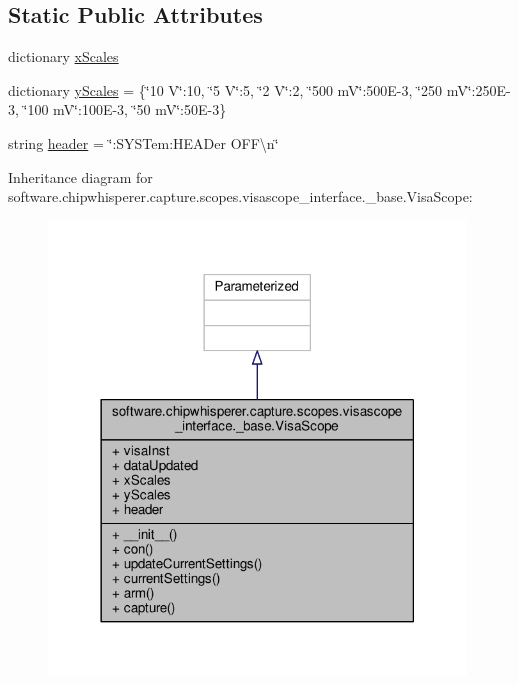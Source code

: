 \subsection*{Static Public Attributes}
\begin{DoxyCompactItemize}
\item 
dictionary \hyperlink{classsoftware_1_1chipwhisperer_1_1capture_1_1scopes_1_1visascope__interface_1_1__base_1_1VisaScope_ab74cc47f85321bdbb1389d3293ca644a}{x\+Scales}
\item 
dictionary \hyperlink{classsoftware_1_1chipwhisperer_1_1capture_1_1scopes_1_1visascope__interface_1_1__base_1_1VisaScope_a360d88817d0e4aad46ee2f617ff3666c}{y\+Scales} = \{\char`\"{}10 V\char`\"{}\+:10, \char`\"{}5 V\char`\"{}\+:5, \char`\"{}2 V\char`\"{}\+:2, \char`\"{}500 m\+V\char`\"{}\+:500\+E-\/3, \char`\"{}250 m\+V\char`\"{}\+:250\+E-\/3, \char`\"{}100 m\+V\char`\"{}\+:100\+E-\/3, \char`\"{}50 m\+V\char`\"{}\+:50\+E-\/3\}
\item 
string \hyperlink{classsoftware_1_1chipwhisperer_1_1capture_1_1scopes_1_1visascope__interface_1_1__base_1_1VisaScope_a5a4b7f290f140f690c50b42d8e682939}{header} = \char`\"{}\+:S\+Y\+S\+Tem\+:\+H\+E\+A\+Der O\+F\+F\textbackslash{}n\char`\"{}
\end{DoxyCompactItemize}


Inheritance diagram for software.\+chipwhisperer.\+capture.\+scopes.\+visascope\+\_\+interface.\+\_\+base.\+Visa\+Scope\+:\nopagebreak
\begin{figure}[H]
\begin{center}
\leavevmode
\includegraphics[width=314pt]{d5/d8f/classsoftware_1_1chipwhisperer_1_1capture_1_1scopes_1_1visascope__interface_1_1__base_1_1VisaScope__inherit__graph}
\end{center}
\end{figure}


